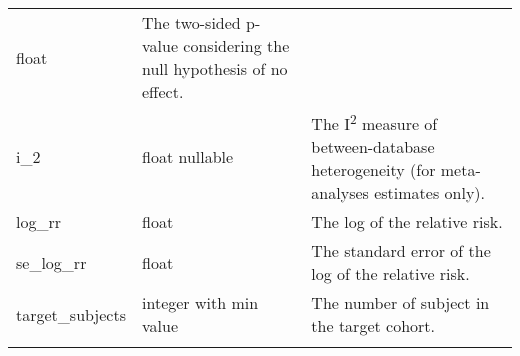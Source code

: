 \documentclass[
]{article}
\begin{document}
\begin{longtable}[]{@{}lll@{}}
\begin{minipage}[t]{0.18\columnwidth}
float\strut
\end{minipage} & \begin{minipage}[t]{0.50\columnwidth}\raggedright
The two-sided p-value considering the null hypothesis of no
effect.\strut
\end{minipage}\tabularnewline
\begin{minipage}[t]{0.23\columnwidth}\raggedright
i\_2\strut
\end{minipage} & \begin{minipage}[t]{0.18\columnwidth}\raggedright
float nullable\strut
\end{minipage} & \begin{minipage}[t]{0.50\columnwidth}\raggedright
The I\textsuperscript{2} measure of between-database heterogeneity (for
meta-analyses estimates only).\strut
\end{minipage}\tabularnewline
\begin{minipage}[t]{0.23\columnwidth}\raggedright
log\_rr\strut
\end{minipage} & \begin{minipage}[t]{0.18\columnwidth}\raggedright
float\strut
\end{minipage} & \begin{minipage}[t]{0.50\columnwidth}\raggedright
The log of the relative risk.\strut
\end{minipage}\tabularnewline
\begin{minipage}[t]{0.23\columnwidth}\raggedright
se\_log\_rr\strut
\end{minipage} & \begin{minipage}[t]{0.18\columnwidth}\raggedright
float\strut
\end{minipage} & \begin{minipage}[t]{0.50\columnwidth}\raggedright
The standard error of the log of the relative risk.\strut
\end{minipage}\tabularnewline
\begin{minipage}[t]{0.23\columnwidth}\raggedright
target\_subjects\strut
\end{minipage} & \begin{minipage}[t]{0.18\columnwidth}\raggedright
integer with min value\strut
\end{minipage} & \begin{minipage}[t]{0.50\columnwidth}\raggedright
The number of subject in the target cohort.\strut
\end{minipage}\tabularnewline
\begin{minipage}[t]{0.23\columnwidth}\raggedright

\end{minipage}
\end{longtable}
\end{document}
